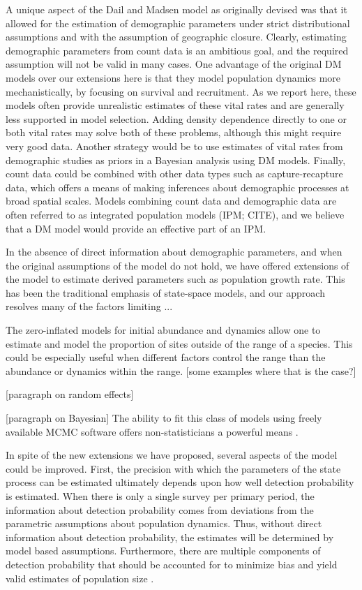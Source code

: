 \documentclass[12pt]{article}
\begin{document}
A unique aspect of the Dail and Madsen model as originally
devised was that it allowed for the estimation of demographic
parameters under strict distributional assumptions and with the
assumption of geographic closure. Clearly, estimating
demographic parameters from count data is an ambitious goal, and
the required assumption will not be valid in many cases. One
advantage of the original DM models over our extensions here is
that they model population dynamics more mechanistically, by
focusing on survival and recruitment. As we report here, these
models often provide unrealistic estimates of these vital rates
and are generally less supported in model selection. Adding
density dependence directly to one or both vital rates may solve
both of these problems, although this might require very good
data. Another strategy would be to use estimates of vital rates
from demographic studies as priors in a Bayesian analysis using
DM models. Finally, count data could be combined with other data
types such as capture-recapture data, which offers a means of
making inferences about demographic processes at broad spatial
scales. Models combining count data and demographic data are
often referred to as integrated population models (IPM; CITE),
and we believe that a DM model would provide an effective part
of an IPM.

In the absence of direct information about demographic parameters, and
when the original assumptions of the model do not hold, we have
offered extensions of the model to estimate derived parameters such as
population growth rate. This has been the traditional emphasis of
state-space models, and our approach resolves many of the factors
limiting ...

The zero-inflated models for initial
abundance and dynamics allow one to estimate and model the proportion
of sites outside of the range of a species.  This could be especially
useful when different factors control the range than the abundance or
dynamics within the range.  [some examples where that is the case?]

[paragraph on random effects]


[paragraph on Bayesian]
The ability to fit this class of models using freely available MCMC
software offers non-statisticians a powerful means .

In spite of the new extensions we have proposed, several aspects of
the model could be improved. First, the precision with which the
parameters of the state process can be estimated ultimately depends
upon how well detection probability is estimated. When there is only a
single survey per primary period, the information about detection
probability comes from deviations from the parametric assumptions
about population dynamics. Thus, without direct information about
detection probability, the estimates will be determined by model based
assumptions. Furthermore, there are multiple components of detection
probability that should be accounted for to minimize bias and yield
valid estimates of population size \citep{nichols_etal:2009}.
\end{document}
